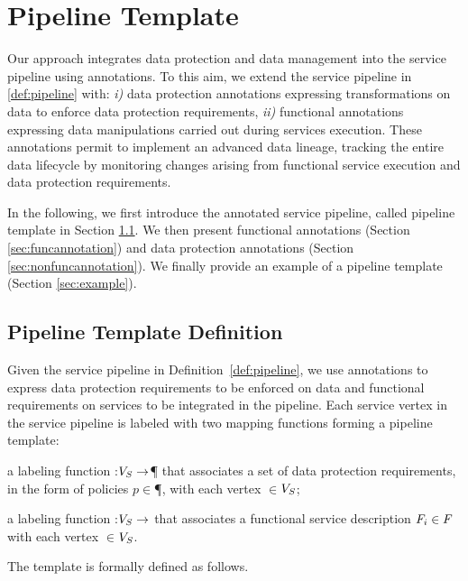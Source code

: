 \section{Pipeline Template}\label{sec:template}
Our approach integrates data protection and data management into the service pipeline using annotations.
To this aim, we extend the service pipeline in \cref{def:pipeline} with: \emph{i)} data protection annotations expressing transformations on data to enforce data protection requirements, \emph{ii)} functional annotations expressing data manipulations carried out during services execution.
These annotations permit to implement an advanced data lineage, tracking the entire data lifecycle by monitoring changes arising from functional service execution and data protection requirements.

In the following, we first introduce the annotated service pipeline, called pipeline template in Section \ref{sec:templatedefinition}. We then present functional annotations (Section \ref{sec:funcannotation}) and data protection annotations (Section \ref{sec:nonfuncannotation}). We finally provide an example of a pipeline template (Section \ref{sec:example}).


\subsection{Pipeline Template Definition}\label{sec:templatedefinition}
Given the service pipeline in Definition~\ref{def:pipeline}, we use annotations to express data protection requirements to be enforced on data and functional requirements on services to be integrated in the pipeline. Each service vertex in the service pipeline is labeled with two mapping functions forming a pipeline template:
\begin{enumerate*}[label=\textit{\roman*})]
  \item a labeling function \myLambda:$V_S\rightarrow$\P{} that associates a set of data protection requirements, in the form of policies $p$$\in$\P{}, with each vertex $\in$$V_S$;
  \item a labeling function \myGamma:$V_S\rightarrow$\F{} that associates a functional service description $F_i\in F_{}$ with each vertex $\in$$V_S$.
\end{enumerate*}

The template is formally defined as follows.


